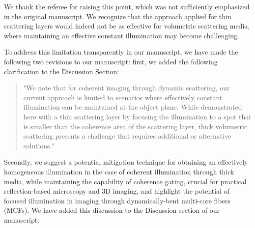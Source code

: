 \documentclass[12pt]{article}
\newenvironment{finished_ourresponse}
    {\begin{tcolorbox}[width=\linewidth,breakable,enhanced,colback=gray!5,colframe=finished_responsecolor!50,title=Response,left=5pt,right=5pt]}
    {\end{tcolorbox}}
\begin{document}
\begin{finished_ourresponse}
    We thank the referee for raising this point, which was not sufficiently emphasized in the original manuscript. 
    We recognize that the approach applied for thin scattering layers would indeed not be as effective for volumetric scattering media, where maintaining an effective constant illumination may become challenging.
    
    To address this limitation transparently in our manuscript, we have made the following two revisions to our manuscript: first, we added the following clarification to the Discussion Section:
    
    \begin{quote}
        "We note that for coherent imaging through dynamic scattering, our current approach is limited to scenarios where effectively constant illumination can be maintained at the object plane. While demonstrated here with a thin scattering layer by focusing the illumination to a spot that is smaller than the coherence area of the scattering layer, thick volumetric scattering presents a challenge that requires additional or alternative solutions."
    \end{quote}
    
     Secondly, we suggest a potential mitigation technique for obtaining an effectively homogeneous illumination in the case of coherent illumination through thick media, while maintaining the capability of coherence gating, crucial for practical reflection-based microscopy and 3D imaging, and highlight the potential of focused illumination in imaging through dynamically-bent multi-core fibers (MCFs). We have added this discussion to the Discussion section of our manuscript:

     \begin{quote}
     

\end{quote}
\end{finished_ourresponse}
\end{document}
